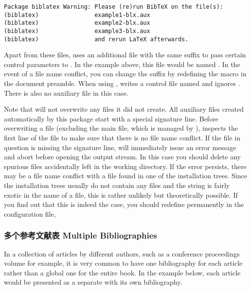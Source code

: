 \begin{lstlisting}[style=plain]
Package biblatex Warning: Please (re)run BibTeX on the file(s):
(biblatex)                example1-blx.aux
(biblatex)                example2-blx.aux
(biblatex)                example3-blx.aux
(biblatex)                and rerun LaTeX afterwards.
\end{lstlisting}
%
Apart from these  files, \biblatex uses an additional  file with the same suffix to pass certain control parameters to \bibtex. In the example above, this file would be named . In the event of a file name conflict, you can change the suffix by redefining the macro  in the document preamble. When using \biber, \biblatex writes a control file named  and ignores . There is also no auxiliary  file in this case.

Note that \biblatex will not overwrite any files it did not create. All auxiliary files created automatically by this package start with a special signature line. Before overwriting a file (excluding the main  file, which is managed by \latex), \biblatex inspects the first line of the file to make sure that there is no file name conflict. If the file in question is missing the signature line, \biblatex will immediately issue an error message and abort before opening the output stream. In this case you should delete any spurious files accidentally left in the working directory. If the error persists, there may be a file name conflict with a file found in one of the \tex installation trees. Since the installation trees usually do not contain any  files and the string  is fairly exotic in the name of a  file, this is rather unlikely but theoretically possible. If you find out that this is indeed the case, you should redefine  permanently in the \biblatex configuration file, 

\subsubsection{多个参考文献表 Multiple Bibliographies}
\label{use:use:mlt}

In a collection of articles by different authors, such as a conference proceedings volume for example, it is very common to have one bibliography for each article rather than a global one for the entire book. In the example below, each article would be presented as a separate  with its own bibliography.

